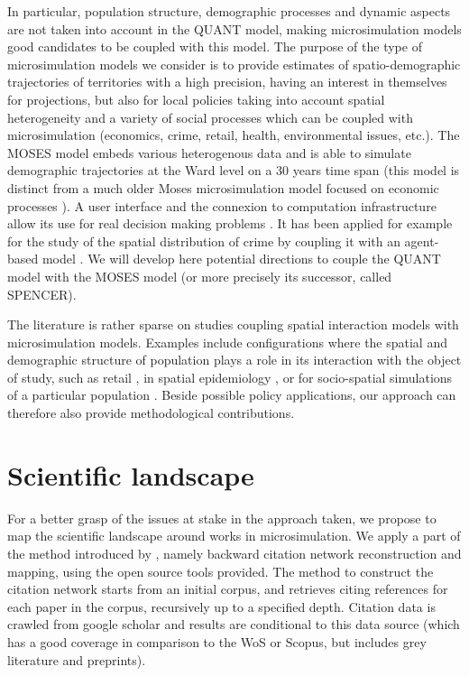 In particular, population structure, demographic processes and dynamic aspects are not taken into account in the QUANT model, making microsimulation models \cite{birkin2011spatial} good candidates to be coupled with this model. The purpose of the type of microsimulation models we consider is to provide estimates of spatio-demographic trajectories of territories with a high precision, having an interest in themselves for projections, but also for local policies taking into account spatial heterogeneity and a variety of social processes which can be coupled with microsimulation (economics, crime, retail, health, environmental issues, etc.). The MOSES model embeds various heterogenous data and is able to simulate demographic trajectories at the Ward level on a 30 years time span \cite{townend2009moses,Wu2013} (this model is distinct from a much older Moses microsimulation model focused on economic processes \cite{eliasson1989moses}). A user interface and the connexion to computation infrastructure allow its use for real decision making problems \cite{birkin2009moses}. It has been applied for example for the study of the spatial distribution of crime by coupling it with an agent-based model \cite{malleson2012analysis}. We will develop here potential directions to couple the QUANT model with the MOSES model (or more precisely its successor, called SPENCER).

The literature is rather sparse on studies coupling spatial interaction models with microsimulation models. Examples include configurations where the spatial and demographic structure of population plays a role in its interaction with the object of study, such as retail \cite{Nakaya2007}, in spatial epidemiology \cite{morrissey2010examining}, or for socio-spatial simulations of a particular population \cite{wu2008spatial}. Beside possible policy applications, our approach can therefore also provide methodological contributions.





\section{Scientific landscape}

For a better grasp of the issues at stake in the approach taken, we propose to map the scientific landscape around works in microsimulation. We apply a part of the method introduced by \cite{raimbault2017exploration}, namely backward citation network reconstruction and mapping, using the open source tools provided. The method to construct the citation network starts from an initial corpus, and retrieves citing references for each paper in the corpus, recursively up to a specified depth. Citation data is crawled from google scholar and results are conditional to this data source (which has a good coverage in comparison to the WoS or Scopus, but includes grey literature and preprints).

